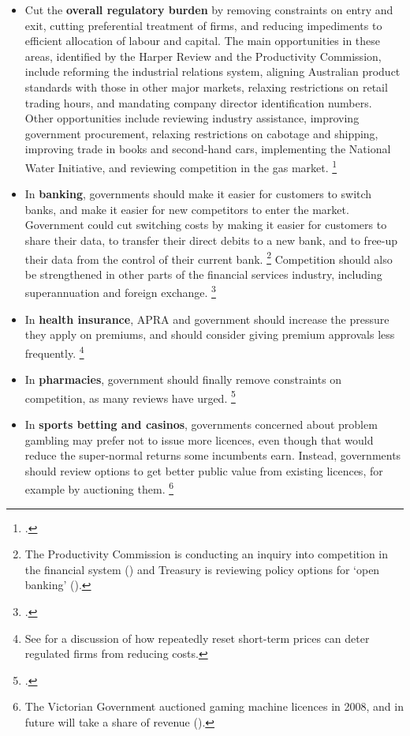 \begin{itemize}
\item Cut the \textbf{overall regulatory burden} by removing constraints on entry and exit, cutting preferential treatment of firms, and reducing impediments to efficient allocation of labour and capital. The main opportunities in these areas, identified by the Harper Review and the Productivity Commission, include reforming the industrial relations system, aligning Australian product standards with those in other major markets, relaxing restrictions on retail trading hours, and mandating company director identification numbers. Other opportunities include reviewing industry assistance, improving government procurement, relaxing restrictions on cabotage and shipping, improving trade in books and second-hand cars, implementing the National Water Initiative, and reviewing competition in the gas market.%
\footnote{\textcites{Harper2015Competition}{PC-shiftthedial-2017}.}
\item In \textbf{banking}, governments should make it easier for customers to switch banks, and make it easier for new competitors to enter the market. Government could cut switching costs by making it easier for customers to share their data, to transfer their direct debits to a new bank, and to free-up their data from the control of their current bank.%
\footnote{The Productivity Commission is conducting an inquiry into competition in the financial system (\textcite{PC-FScompetition-2017}) and Treasury is reviewing policy options for `open banking' (\textcite{Treasury-openbanking-2017}).}
Competition should also be strengthened in other parts of the financial services industry, including superannuation and foreign exchange.%
\footnote{\textcites{MinifieSavageCameron-2015-Super-savings}{Forexfees2017}.}
\item In \textbf{health insurance}, APRA and government should increase the pressure they apply on premiums, and should consider giving premium approvals less frequently.%
\footnote{See \textcite[][Chapter~9]{LaffontTiroleTheory1993} for a discussion of how repeatedly reset short-term prices can deter regulated firms from reducing costs.} 
\item In \textbf{pharmacies}, government should finally remove constraints on competition, as many reviews have urged.%
\footcite{PC-shiftthedial-2017}
\item In \textbf{sports betting and casinos}, governments concerned about problem gambling may prefer not to issue more licences, even though that would reduce the super-normal returns some incumbents earn. Instead, governments should review options to get better public value from existing licences, for example by auctioning them.%
\footnote{The Victorian Government auctioned gaming machine licences in 2008, and in future will take a share of revenue (\textcite{Vic-gaming-machine-2017}).}

\end{itemize}

